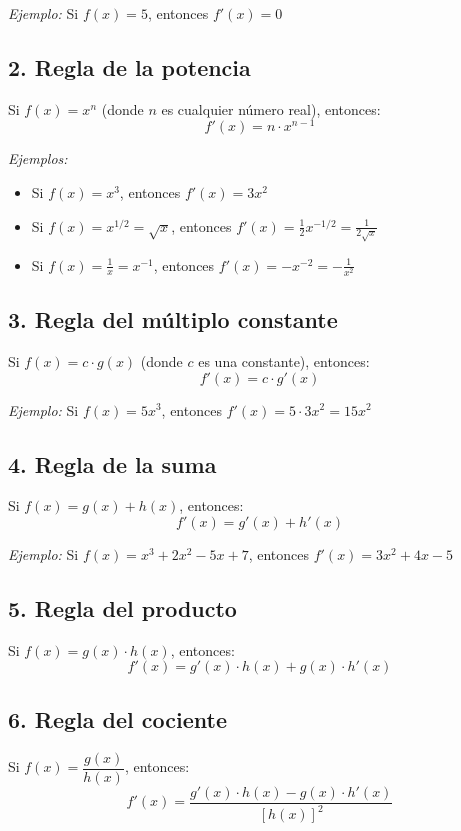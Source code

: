\documentclass[12pt,a4paper]{article}
\begin{document}
\textit{Ejemplo:} Si $f(x) = 5$, entonces $f'(x) = 0$

\subsection*{2. Regla de la potencia}

Si $f(x) = x^n$ (donde $n$ es cualquier número real), entonces:
\[
\boxed{f'(x) = n \cdot x^{n-1}}
\]

\textit{Ejemplos:}
\begin{itemize}
	\item Si $f(x) = x^3$, entonces $f'(x) = 3x^2$
	\item Si $f(x) = x^{1/2} = \sqrt{x}$, entonces $f'(x) = \frac{1}{2}x^{-1/2} = \frac{1}{2\sqrt{x}}$
	\item Si $f(x) = \frac{1}{x} = x^{-1}$, entonces $f'(x) = -x^{-2} = -\frac{1}{x^2}$
\end{itemize}

\subsection*{3. Regla del múltiplo constante}

Si $f(x) = c \cdot g(x)$ (donde $c$ es una constante), entonces:
\[
\boxed{f'(x) = c \cdot g'(x)}
\]

\textit{Ejemplo:} Si $f(x) = 5x^3$, entonces $f'(x) = 5 \cdot 3x^2 = 15x^2$

\subsection*{4. Regla de la suma}

Si $f(x) = g(x) + h(x)$, entonces:
\[
\boxed{f'(x) = g'(x) + h'(x)}
\]

\textit{Ejemplo:} Si $f(x) = x^3 + 2x^2 - 5x + 7$, entonces $f'(x) = 3x^2 + 4x - 5$

\subsection*{5. Regla del producto}

Si $f(x) = g(x) \cdot h(x)$, entonces:
\[
\boxed{f'(x) = g'(x) \cdot h(x) + g(x) \cdot h'(x)}
\]

\subsection*{6. Regla del cociente}

Si $f(x) = \dfrac{g(x)}{h(x)}$, entonces:
\[
\boxed{f'(x) = \frac{g'(x) \cdot h(x) - g(x) \cdot h'(x)}{[h(x)]^2}}
\]
\end{document}
